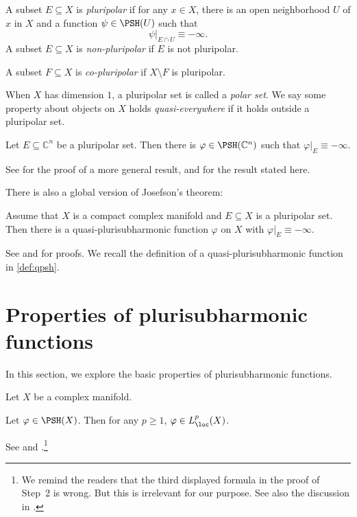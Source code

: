 \begin{definition}\label{def:pluripolarsets}
    A subset $E\subseteq X$ is \emph{pluripolar} if for any $x\in X$, there is an open neighborhood $U$ of $x$ in $X$ and a function $\psi\in \PSH(U)$ such that
    \[
    \psi|_{E\cap U}\equiv -\infty.
    \]
    A subset $E\subseteq X$ is \emph{non-pluripolar} if $E$ is not pluripolar.

    A subset $F\subseteq X$ is \emph{co-pluripolar} if $X\setminus F$ is pluripolar.
\end{definition}
When $X$ has dimension $1$, a pluripolar set is called a \emph{polar set}. We say some property about objects on $X$ holds \emph{quasi-everywhere} if it holds outside a pluripolar set.


\begin{theorem}\label{thm:Josefson}
    Let $E\subseteq \mathbb{C}^n$ be a pluripolar set. Then there is $\varphi\in \PSH(\mathbb{C}^n)$ such that $\varphi|_E\equiv -\infty$.
\end{theorem}
See \cite[Corollary~4.41]{GZ17} for the proof of a more general result, and \cite[Theorem~10.2.1]{FPT} for the result stated here.

There is also a global version of Josefson's theorem:
\begin{theorem}\label{thm:gloJosefson}
    Assume that $X$ is a compact complex manifold and $E\subseteq X$ is a pluripolar set. Then there is a quasi-plurisubharmonic function $\varphi$ on $X$ with $\varphi|_E\equiv -\infty$.
\end{theorem}
See \cite{Vu19} and \cite[Theorem~14.8.7]{FPT} for proofs. We recall the definition of a quasi-plurisubharmonic function in \cref{def:qpsh}.


\section{Properties of plurisubharmonic functions}
\label{sec:psh_properties}
In this section, we explore the basic properties of plurisubharmonic functions.

Let $X$ be a complex manifold.

\begin{proposition}\label{prop:pshlocLp}
    Let $\varphi\in \PSH(X)$. Then for any $p\geq 1$, $\varphi\in L^p_{\loc}(X)$.
\end{proposition}
See \cite[Theorem~1.46, Theorem~1.48]{GZ17} and \cite[Theorem~8.3.7]{FPT}.\footnote{We remind the readers that the third displayed formula in the proof of \cite[Theorem~1.48]{GZ17} Step~2 is wrong. But this is irrelevant for our purpose. See also the discussion in \cite[Section~B.8]{FPT}.}

